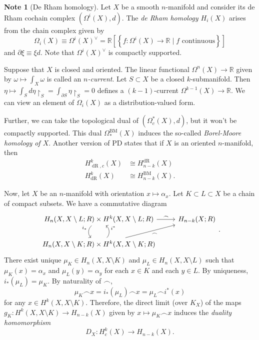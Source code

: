 \documentclass[10pt,letterpaper,cm]{nupset}
\theoremstyle{definition}
\newtheorem{note}[definition]{Note}
\theoremstyle{theorem}
\theoremstyle{remark}
\newcommand{\R}{\mathbb{R}}
\newcommand{\1}{\mathbb{1}}
\newcommand{\0}{\vec 0}
\DeclareMathOperator{\dr}{dR}
\DeclareMathOperator{\BM}{BM}
\begin{document}
\begin{note}[De Rham homology]
Let $X$ be a smooth $n$-manifold and consider its de Rham cochain complex $\left(\Omega^i(X), d\right)$. The \textit{de Rham homology $H_i(X)$} arises from the chain complex given by $$\Omega_i(X) \equiv \Omega^i(X)^{\vee} = \R\left[\left\{f : \Omega^i(X) \to \R \mid f \text{ continuous}\right\}\right]$$ and $\partial{\xi} \equiv \xi{d}$. Note that $ \Omega^i(X)^{\vee}$ is compactly supported. 

Suppose that $X$ is closed and oriented. The linear functional $\Omega^n(X) \to \R$ given by $\omega  \mapsto \int_X \omega$ is called an \textit{$n$-current}. Let $S \subset X$ be a closed $k$-submanifold. Then $ \eta \mapsto \int_S d{\eta \restriction_S} = \int_{\partial{S}} \eta \restriction_S =0$ defines a $\left(k-1\right)$-current $\Omega^{k-1}(X) \to \R$. We can view an element of $\Omega_i(X)$ as a distribution-valued form.

Further, we can take the topological dual of $\left(\Omega_c^{\ast}(X), d\right)$, but it won't be compactly supported. This dual $\Omega_{\ast}^{\BM}(X)$ induces the so-called \textit{Borel-Moore homology of $X$}. Another version of PD states that if $X$ is an oriented $n$-manifold, then
\begin{align*}
H^k_{\dr, c}(X) & \cong H^{\dr}_{n-k}(X)
\\  H^k_{\dr}(X) & \cong  H^{\BM}_{n-k}(X) 
. \end{align*}
\end{note}

\medskip

Now, let $X$ be an $n$-manifold with orientation $x \mapsto \alpha_x$. Let $K \subset  L \subset X$ be a chain of compact subsets.  We have a commutative diagram
\[
\begin{tikzcd}
{H_n(X, X \setminus L; R)\times H^k(X, X \setminus L; R)} \arrow[r, "\frown"] \arrow[d, "i_{\ast}"', bend right=49]     & H_{n-k}(X; R) \\
{H_n(X, X \setminus K; R) \times H^k(X, X \setminus K ; R)} \arrow[ru, "\frown"'] \arrow[u, "i^{\ast}"', bend right=49] &              
\end{tikzcd}
.\] There exist unique $\mu_K \in H_n(X, X \setminus K)$ and $\mu_L \in H_n(X, X \setminus L)$ such that $\mu_K(x) = \alpha_x$ and $\mu_L(y) = \alpha_y$ for each $x\in K$ and each $y\in L$. By uniqueness, $i_{\ast}(\mu_L) = \mu_K$. By naturality of $\frown$, $$\mu_K \frown x = i_{\ast}(\mu_L) \frown x = \mu_L \frown i^{\ast}(x)$$ for any $x\in H^k(X, X \setminus K)$. Therefore, the direct limit (over $K_X$) of the maps $g_K : H^k(X, X \setminus K) \to H_{n-k}(X)$ given by $x \mapsto \mu_K \frown x$ induces the \textit{duality homomorphism} $$ D_X : H_c^k(X) \to H_{n-k}(X)  .$$
\end{document}

